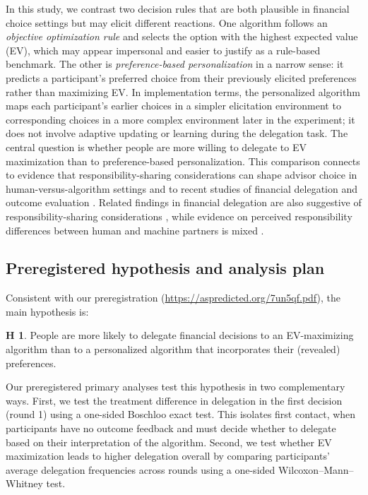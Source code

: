 \documentclass[a4paper, 12pt, fleqn]{article}
\theoremstyle{definition}
\newtheorem{hyp}{H}
\begin{document}
In this study, we contrast two decision rules that are both plausible in financial choice settings but may elicit different reactions. One algorithm follows an \emph{objective optimization rule} and selects the option with the highest expected value (EV), which may appear impersonal and easier to justify as a rule-based benchmark. The other is \emph{preference-based personalization} in a narrow sense: it predicts a participant's preferred choice from their previously elicited preferences rather than maximizing EV. In implementation terms, the personalized algorithm maps each participant's earlier choices in a simpler elicitation environment to corresponding choices in a more complex environment later in the experiment; it does not involve adaptive updating or learning during the delegation task.
The central question is whether people are more willing to delegate to EV maximization than to preference-based personalization. This comparison connects to evidence that responsibility-sharing considerations can shape advisor choice in human-versus-algorithm settings \citep{Gazit2023} and to recent studies of financial delegation and outcome evaluation \citep{Ismagilova2025}. Related findings in financial delegation are also suggestive of responsibility-sharing considerations \citep{Werner2026}, while evidence on perceived responsibility differences between human and machine partners is mixed \citep{Kirchkamp2019}.

\subsection*{Preregistered hypothesis and analysis plan}
Consistent with our preregistration ({\scriptsize\url{https://aspredicted.org/7un5qf.pdf}}), the main hypothesis is: 
\begin{hyp}
	People are more likely to delegate financial decisions to an EV-maximizing algorithm than to a personalized algorithm that incorporates their (revealed) preferences.
\end{hyp}

Our preregistered primary analyses test this hypothesis in two complementary ways. First, we test the treatment difference in delegation in the first decision (round 1) using a one-sided Boschloo exact test. This isolates first contact, when participants have no outcome feedback and must decide whether to delegate based on their interpretation of the algorithm. Second, we test whether EV maximization leads to higher delegation overall by comparing participants' average delegation frequencies across rounds using a one-sided Wilcoxon--Mann--Whitney test.
\end{document}
